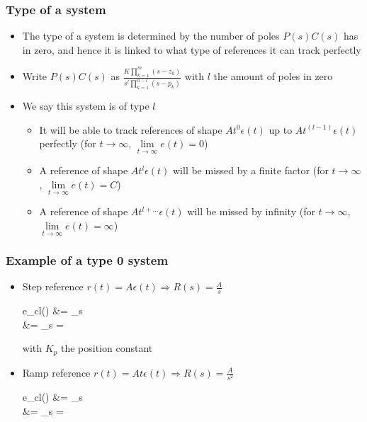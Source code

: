 \begin{frame}
	\frametitle{Type of a system}
	\begin{itemize}
		\item The type of a system is determined by the number of poles $P(s)C(s)$ has in zero, and hence it is linked to what type of references it can track perfectly
		\item Write $P(s)C(s)$ as $\frac{K \prod_{k=1}^{m} (s-z_k)}{s^l \prod_{k=1}^{n-l} (s-p_k)}$ with $l$ the amount of poles in zero
		\item We say this system is of type $l$
		\begin{itemize}
			\item It will be able to track references of shape $At^0 \epsilon(t)$ up to $At^{(l - 1)} \epsilon(t)$ perfectly (for $t\rightarrow \infty$, $\lim\limits_{t \rightarrow \infty} e(t) = 0$)
			\item A reference of shape $At^l \epsilon(t)$ will be missed by a finite factor (for $t\rightarrow \infty$, $\lim\limits_{t \rightarrow \infty} e(t) = C$)
			\item A reference of shape $At^{l+...} \epsilon(t)$ will be missed by infinity (for $t\rightarrow \infty$, $\lim\limits_{t \rightarrow \infty} e(t) = \infty$)
		\end{itemize}
	\end{itemize}
\end{frame}

\begin{frame}
	\frametitle{Example of a type 0 system}
	\begin{itemize}
		\item Step reference $r(t) = A \epsilon (t) \Rightarrow R(s) = \frac{A}{s}$
		\begin{flalign*}
			e_{cl}(\infty) &= \lim\limits_{s }   \\
			&= \lim\limits_{s } 
			= 
		\end{flalign*}
		with $K_p$ the position constant
		\item Ramp reference $r(t) = At \epsilon (t) \Rightarrow R(s) = \frac{A}{s^2}$
		\begin{flalign*}
			e_{cl}(\infty) &= \lim\limits_{s }  \frac{A}{s^2} \\
			&= \lim\limits_{s }  = \infty
		\end{flalign*}
	\end{itemize}
\end{frame}	

